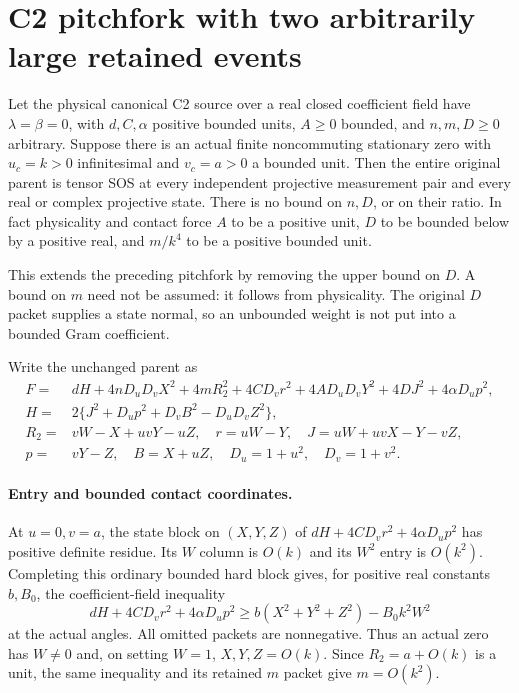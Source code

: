 \section{\texorpdfstring{C2 pitchfork with two arbitrarily large retained events}{C2 pitchfork with two arbitrarily large retained events}}
\label{component:p0c7a15f800d9}

\label{p0c7a15f800d9:sec:c2-two-large}

\begin{theorem}
\label{p0c7a15f800d9:thm:c2-two-large}
Let the physical canonical C2 source over a real closed coefficient
field have $\lambda=\beta=0$, with $d,C,\alpha$ positive bounded
units, $A\geq0$ bounded, and $n,m,D\geq0$ arbitrary. Suppose there is
an actual finite noncommuting stationary zero with $u_c=k>0$
infinitesimal and $v_c=a>0$ a bounded unit. Then the entire original
parent is tensor SOS at every independent projective measurement
pair and every real or complex projective state.
There is no bound on $n,D$, or on their ratio. In fact physicality and
contact force $A$ to be a positive unit, $D$ to be bounded below by
a positive real, and $m/k^4$ to be a positive bounded unit.
\end{theorem}

This extends the preceding pitchfork by removing the upper bound on
$D$. A bound on $m$ need not be assumed: it follows from physicality.
The original $D$ packet supplies a state normal, so an unbounded
weight is not put into a bounded Gram coefficient.

Write the unchanged parent as
\[
\begin{split}
F={}&dH+4nD_uD_vX^2+4mR_2^2+4CD_vr^2
       +4AD_uD_vY^2+4DJ^2+4\alpha D_up^2,\\
H={}&2\{J^2+D_up^2+D_vB^2-D_uD_vZ^2\},\\
R_2={}&vW-X+uvY-uZ,\quad r=uW-Y,\quad
J=uW+uvX-Y-vZ,\\
p={}&vY-Z,\quad B=X+uZ,\quad D_u=1+u^2,\quad D_v=1+v^2.
\end{split}                                                    \tag{TD1}
\]

\paragraph{Entry and bounded contact coordinates.}
At $u=0,v=a$, the state block on $(X,Y,Z)$ of
$dH+4CD_vr^2+4\alpha D_up^2$ has positive definite residue.
Its $W$ column is $O(k)$ and its $W^2$ entry is $O(k^2)$.
Completing this ordinary bounded hard block gives, for positive
real constants $b,B_0$, the coefficient-field inequality
\[
 dH+4CD_vr^2+4\alpha D_up^2
 \geq b(X^2+Y^2+Z^2)-B_0 k^2W^2
\]
at the actual angles. All omitted packets are nonnegative.
Thus an actual zero has $W\ne0$ and, on setting $W=1$,
$X,Y,Z=O(k)$. Since $R_2=a+O(k)$ is a unit, the same inequality
and its retained $m$ packet give $m=O(k^2)$.

